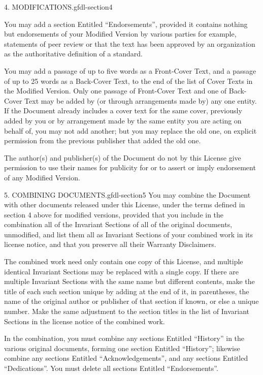 \documentclass[10pt,]{book}
\numberwithin{equation}{section}
\begin{document}
\begin{paragraphs}{4. MODIFICATIONS.}{gfdl-section4}
\par
\hypertarget{p-1563}{}%
You may add a section Entitled ``Endorsements'', provided it contains nothing but endorsements of your Modified Version by various parties \textemdash{} for example, statements of peer review or that the text has been approved by an organization as the authoritative definition of a standard.%
\par
\hypertarget{p-1564}{}%
You may add a passage of up to five words as a Front-Cover Text, and a passage of up to 25 words as a Back-Cover Text, to the end of the list of Cover Texts in the Modified Version. Only one passage of Front-Cover Text and one of Back-Cover Text may be added by (or through arrangements made by) any one entity. If the Document already includes a cover text for the same cover, previously added by you or by arrangement made by the same entity you are acting on behalf of, you may not add another; but you may replace the old one, on explicit permission from the previous publisher that added the old one.%
\par
\hypertarget{p-1565}{}%
The author(s) and publisher(s) of the Document do not by this License give permission to use their names for publicity for or to assert or imply endorsement of any Modified Version.%
\end{paragraphs}%
\begin{paragraphs}{5. COMBINING DOCUMENTS.}{gfdl-section5}%
\hypertarget{p-1566}{}%
You may combine the Document with other documents released under this License, under the terms defined in section 4 above for modified versions, provided that you include in the combination all of the Invariant Sections of all of the original documents, unmodified, and list them all as Invariant Sections of your combined work in its license notice, and that you preserve all their Warranty Disclaimers.%
\par
\hypertarget{p-1567}{}%
The combined work need only contain one copy of this License, and multiple identical Invariant Sections may be replaced with a single copy. If there are multiple Invariant Sections with the same name but different contents, make the title of each such section unique by adding at the end of it, in parentheses, the name of the original author or publisher of that section if known, or else a unique number. Make the same adjustment to the section titles in the list of Invariant Sections in the license notice of the combined work.%
\par
\hypertarget{p-1568}{}%
In the combination, you must combine any sections Entitled ``History'' in the various original documents, forming one section Entitled ``History''; likewise combine any sections Entitled ``Acknowledgements'', and any sections Entitled ``Dedications''. You must delete all sections Entitled ``Endorsements''.%
\end{paragraphs}%
\end{document}
